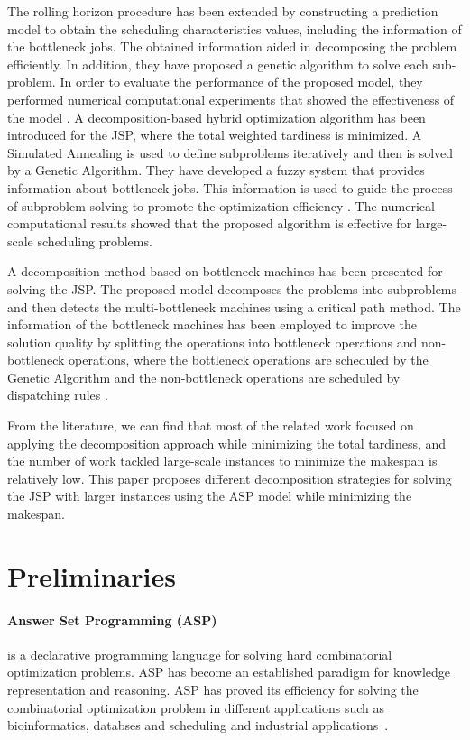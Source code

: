 \documentclass[runningheads]{llncs}
\begin{document}
The rolling horizon procedure has been extended by constructing a prediction model to obtain the scheduling characteristics values, including the information of the bottleneck jobs. The obtained information aided in decomposing the problem efficiently. In addition, they have proposed a genetic algorithm to solve each sub-problem. In order to evaluate the performance of the proposed model, they performed numerical computational experiments that showed the effectiveness of the model \cite{liu2008prediction}. A decomposition-based hybrid optimization algorithm has been introduced for the JSP, where the total weighted tardiness is minimized. A Simulated Annealing is used to define subproblems iteratively and then is solved by a Genetic Algorithm. They have developed a fuzzy system that provides information about bottleneck jobs. This information is used to guide the process of subproblem-solving to promote the optimization efficiency \cite{zhang2010hybrid}. The numerical computational results showed that the proposed algorithm is effective for large-scale scheduling problems.

A decomposition method based on bottleneck machines has been presented for solving the JSP. The proposed model decomposes the problems into subproblems and then detects the multi-bottleneck machines using a critical path method. The information of the bottleneck machines has been employed to improve the solution quality by splitting the operations into bottleneck operations and non-bottleneck operations, where the bottleneck operations are scheduled by the Genetic Algorithm and the non-bottleneck operations are scheduled by dispatching rules \cite{zhai2014decomposition}.

From the literature, we can find that most of the related work focused on applying the decomposition approach while minimizing the total tardiness, and the number of work tackled large-scale instances to minimize the makespan is relatively low. This paper proposes different decomposition strategies for solving the JSP with larger instances using the ASP model while minimizing the makespan.

\section{Preliminaries}
\paragraph{Answer Set Programming (ASP)} is a declarative programming language for solving hard combinatorial optimization problems. ASP has become an established paradigm for knowledge representation and reasoning. ASP has proved its efficiency for solving the combinatorial optimization problem in different applications such as bioinformatics\cite{erdem2015generating,koponen2015optimizing}, databses\cite{caniupan2010consistency} and scheduling and industrial applications~\cite{dodaro2015allotment,dodaro2016combining,fabricius2020towards,dodaro2021operating}.
\end{document}
